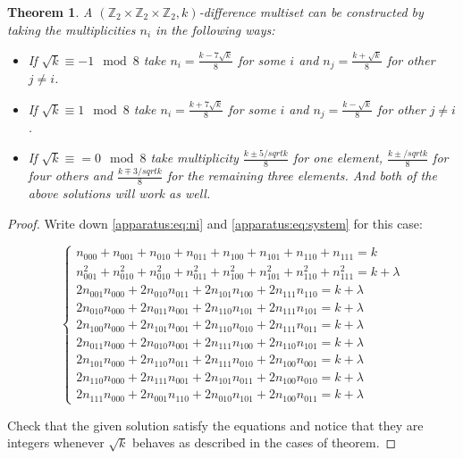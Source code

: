 \documentclass{article}
\theoremstyle{plain}
\newtheorem{theorem}{Theorem}[section]
\theoremstyle{definition}
\theoremstyle{remark}
\begin{document}
			\begin{theorem}
				A $(\mathbb Z_2 \times \mathbb Z_2 \times \mathbb Z_2, k)$-difference multiset can be constructed by taking the multiplicities $n_i$ in the following ways:
				\begin{itemize}
					\item If $\sqrt k \equiv -1 \mod 8$ take $n_i=\frac{k-7\sqrt k}8$ for some $i$ and $n_j=\frac{k+\sqrt k}8$ for other $j\neq i$.
					\item If $\sqrt k \equiv 1 \mod 8$ take $n_i=\frac{k+7\sqrt k}8$ for some $i$ and $n_j=\frac{k-\sqrt k}8$ for other $j\neq i$.
					\item If $\sqrt k \equiv = 0 \mod 8$ take multiplicity $\frac{k \pm 5/sqrt k}8$ for one element, $\frac{k \pm /sqrt k}8$ for four others and $\frac{k \mp 3/sqrt k}8$ for the remaining three elements. And both of the above solutions will work as well.
				\end{itemize}
			\end{theorem}
			
			\begin{proof}
				Write down \eqref{apparatus:eq:ni} and \eqref{apparatus:eq:system} for this case:
				
				\begin{equation}
					\begin{cases}
						n_{000} + n_{001} + n_{010} + n_{011} + n_{100}  + n_{101}  + n_{110}  + n_{111} = k \\
						n_{001}^2 + n_{010}^2 + n_{010}^2 + n_{011}^2 + n_{100}^2  + n_{101}^2  + n_{110}^2  + n_{111}^2 = k + \lambda \\
						2 n_{001} n_{000} + 2 n_{010} n_{011} + 2 n_{101} n_{100} +  2 n_{111} n_{110} = k + \lambda \\
						2 n_{010} n_{000} + 2 n_{011} n_{001} + 2 n_{110} n_{101} +  2 n_{111} n_{101} = k + \lambda \\
						2 n_{100} n_{000} + 2 n_{101} n_{001} + 2 n_{110} n_{010} +  2 n_{111} n_{011} = k + \lambda \\
						2 n_{011} n_{000} + 2 n_{010} n_{001} + 2 n_{111} n_{100} +  2 n_{110} n_{101} = k + \lambda \\
						2 n_{101} n_{000} + 2 n_{110} n_{011} + 2 n_{111} n_{010} +  2 n_{100} n_{001} = k + \lambda \\
						2 n_{110} n_{000} + 2 n_{111} n_{001} + 2 n_{101} n_{011} +  2 n_{100} n_{010} = k + \lambda \\
						2 n_{111} n_{000} + 2 n_{001} n_{110} + 2 n_{010} n_{101} +  2 n_{100} n_{011} = k + \lambda
					\end{cases}
				\end{equation}
				
				Check that the given solution satisfy the equations and notice that they are integers whenever $\sqrt k$ behaves as described in the cases of theorem.
			\end{proof}
			
\end{document}

